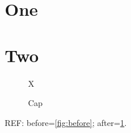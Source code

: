 \documentclass{article}
\begin{document}
\section{One}\section{Two}
\begin{figure}[h]\centering X \label{fig:before}\caption{Cap}\label{fig:after}\end{figure}
REF: before=\ref{fig:before}; after=\ref{fig:after}.
\end{document}
